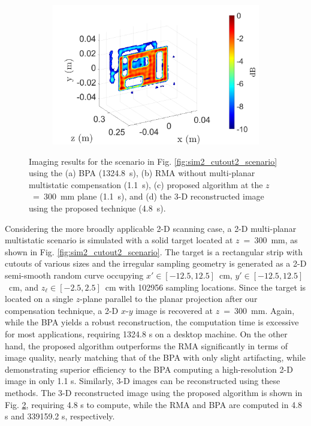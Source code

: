 \documentclass{ieeeaccess}
\begin{document}
\begin{figure}[h]
\begin{subfigure}[b]{0.23\textwidth}
         \caption{}
         \label{fig:sim2_cutout2_RMA_FFH}
    \end{subfigure}
    \hfill
    \begin{subfigure}[b]{0.23\textwidth}
         \centering
         \includegraphics[width=\textwidth]{smith15.png}
         \caption{}
         \label{fig:sim2_cutout2_RMA_FFH_3D}
    \end{subfigure}
\caption{Imaging results for the scenario in Fig. \ref{fig:sim2_cutout2_scenario} using the (a) BPA \mbox{(1324.8 s)}, (b) RMA without multi-planar multistatic compensation \mbox{(1.1 s)}, (c) proposed algorithm at the \mbox{$z$ = 300 mm} plane \mbox{(1.1 s)}, and (d) the \mbox{3-D} reconstructed image using the proposed technique \mbox{(4.8 s)}.}
\label{fig:sim2_cutout2}
\end{figure}

Considering the more broadly applicable \mbox{2-D} scanning case, a \mbox{2-D} multi-planar multistatic scenario is simulated with a solid target located at \mbox{$z$ = 300 mm}, as shown in Fig. \ref{fig:sim2_cutout2_scenario}.
The target is a rectangular strip with cutouts of various sizes and the irregular sampling geometry is generated as a \mbox{2-D} semi-smooth random curve occupying \mbox{$x' \in [-12.5, 12.5]$ cm}, \mbox{$y' \in [-12.5, 12.5]$ cm}, and \mbox{$z_\ell \in [-2.5, 2.5]$ cm} with 102956 sampling locations.
Since the target is located on a single $z$-plane parallel to the planar projection after our compensation technique, a \mbox{2-D} $x$-$y$ image is recovered at \mbox{$z$ = 300 mm}. 
Again, while the BPA yields a robust reconstruction, the computation time is excessive for most applications, requiring 1324.8 s on a desktop machine.
On the other hand, the proposed algorithm outperforms the RMA significantly in terms of image quality, nearly matching that of the BPA with only slight artifacting, while demonstrating superior efficiency to the BPA computing a high-resolution \mbox{2-D} image in only 1.1 s.
Similarly, \mbox{3-D} images can be reconstructed using these methods.
The \mbox{3-D} reconstructed image using the proposed algorithm is shown in Fig. \ref{fig:sim2_cutout2_RMA_FFH_3D}, requiring 4.8 s to compute, while the RMA and BPA are computed in 4.8 s and 339159.2 s, respectively. 
\end{document}

